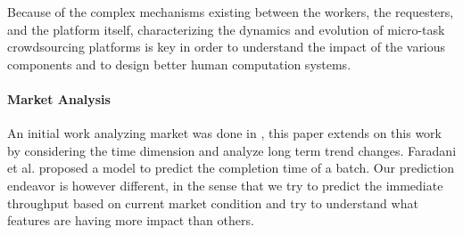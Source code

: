 


Because of the complex mechanisms existing between the workers, the requesters, and the platform itself, characterizing the dynamics and evolution of micro-task crowdsourcing platforms is key in order to understand the impact of the various components and to design better human computation systems.

\paragraph{Market Analysis}
An initial work analyzing \amt{} market was done in \cite{mturk}, this paper extends on this work by considering the time dimension and analyze long term trend changes.
Faradani et al. \cite{faradani2011s} proposed a model to predict the completion time of a batch. Our prediction endeavor is however different, in the sense that we try to predict the immediate throughput based on current market condition and try to understand what features are having more impact than others.

